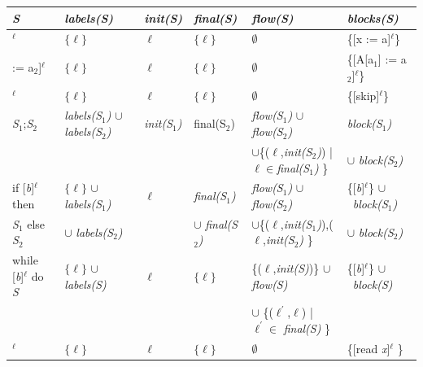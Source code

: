 \begin{table}
\begin{tabular}{| l | l | l | l | l | l |}
\hline	
\textsl{S}                              & \textsl{labels(S)}                                    & \textsl{init(S)}     & \textsl{final(S)}  & \textsl{flow(S)}            & \textsl{blocks(S)}  \\ 
\hline
[x := a]$^\ell$                         & $\{\ell\}$                                            &$\ell$                & $\{\ell\}$ & $\emptyset$        &\{[x := a]$^\ell$\}   \\
\hline
[A[a$_1$] := a$_2$]$^\ell$          & $\{\ell\}$                                            &$\ell$                & $\{\ell\}$ & $\emptyset$      &\{[A[a$_1$] := a$_2$]$^\ell$\}\\
\hline
[skip]$^\ell$                           & $\{\ell\}$                                            &$\ell$                & $\{\ell\}$   & $\emptyset$       &\{[skip]$^\ell$\}  \\
\hline
\textsl{S}$_1$;\textsl{S}$_2$           & \textsl{labels(S$_1$)} $\cup$ \textsl{labels(S$_2$)}  & \textsl{init(S$_1$)} & {final(S$_2$)} & \textsl{flow(S$_1$)} $\cup$ \textsl{flow(S$_2$)} & \textsl{block(S$_1$)}  \\ 
&&&&$\cup$\{($\ell$,\textsl{init(S$_2$)}) | $\ell\in$\textsl{final(S$_1$)} \}& $\cup$ \textsl{block(S$_2$)}\\
\hline
if [\textsl{b}]$^\ell$ then             & $\{\ell\}$ $\cup$  \textsl{labels(S$_1$)}             &$\ell$                & \textsl{final(S$_1$)} & \textsl{flow(S$_1$)} $\cup$ \textsl{flow(S$_2$)}  & \{[\textsl{b}]$^\ell$\} $\cup$\ \textsl{block(S$_1$)} \\
  \textsl{S}$_1$ else \textsl{S}$_2$    &  $\cup$ \textsl{labels(S$_2$)}                        &                      & $\cup$ \textsl{final(S$_2$)} & $\cup$\{($\ell$,\textsl{init(S$_1$)}),($\ell$,\textsl{init(S$_2$)} \}&  $\cup$ \textsl{block(S$_2$)}\\
\hline
while [\textsl{b}]$^\ell$ do \textsl{S} & $\{\ell\}$ $\cup$  \textsl{labels(S)}                 &$\ell$                & $\{\ell\}$ & \{($\ell$,\textsl{init(S)})\} $\cup$\textsl{flow(S)}                 & \{[\textsl{b}]$^\ell$\} $\cup$\ \textsl{block(S)} \\
&&&&$\cup$ \{($\ell^{'}$,$\ell$) |  $\ell^{'}\in$ \textsl{final(S)} \}&\\
\hline
[read \textsl{x}]$^\ell$                & $\{\ell\}$                                            &$\ell$                & $\{\ell\}$ & $\emptyset$                                            &\{[read \textsl{x}]$^\ell$ \}  \\

\end{tabular}
\end{table}
